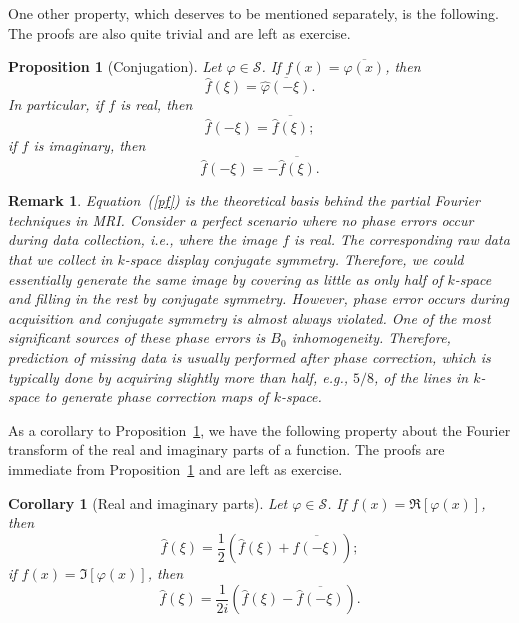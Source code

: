 \documentclass[12pt, letterpaper]{article}
\theoremstyle{plain}
\newtheorem{corollary}[theorem]{Corollary}
\newtheorem{proposition}[theorem]{Proposition}
\newtheorem{remark}[theorem]{Remark}
\renewcommand{\phi}{\varphi}
\begin{document}
One other property, which deserves to be mentioned separately, is the following. The proofs are also quite trivial and are left as exercise. 

\begin{proposition}[Conjugation]\label{conjugation}
    Let $\phi \in \mathcal{S}$. If $f(x) = \overline{\phi(x)}$, then
    \begin{equation}
        \hat{f}(\xi) = \overline{\hat{\phi}(-\xi)}.
    \end{equation}
    In particular, if $f$ is real, then
    \begin{equation}\label{pf}
        \hat{f}(-\xi) = \overline{\hat{f}(\xi)};
    \end{equation}
    if $f$ is imaginary, then
    \begin{equation}
        \hat{f}(-\xi) = -\overline{\hat{f}(\xi)}.
    \end{equation}
\end{proposition}

\begin{remark}
    Equation~(\ref{pf}) is the theoretical basis behind the partial Fourier techniques in MRI. Consider a perfect scenario where no phase errors occur during data collection, i.e., where the image $f$ is real. The corresponding raw data that we collect in $k$-space display conjugate symmetry. Therefore, we could essentially generate the same image by covering as little as only half of $k$-space and filling in the rest by conjugate symmetry. However, phase error occurs during acquisition and conjugate symmetry is almost always violated. One of the most significant sources of these phase errors is $B_0$ inhomogeneity. Therefore, prediction of missing data is usually performed \emph{after} phase correction, which is typically done by acquiring slightly more than half, e.g., $5/8$, of the lines in $k$-space to generate phase correction maps of $k$-space.
\end{remark}

As a corollary to Proposition~\ref{conjugation}, we have the following property about the Fourier transform of the real and imaginary parts of a function. The proofs are immediate from Proposition~\ref{conjugation} and are left as exercise.

\begin{corollary}[Real and imaginary parts]\label{re_im}
    Let $\phi \in \mathcal{S}$. If $f(x) = \Re [\phi(x)]$, then
    \begin{equation}
        \hat{f}(\xi) = \frac{1}{2}\left(\hat{f}(\xi) + \overline{\hat{f}(-\xi)}\right);
    \end{equation}
    if $f(x) = \Im[\phi(x)]$, then
    \begin{equation}
        \hat{f}(\xi) = \frac{1}{2i}\left(\hat{f}(\xi) - \overline{\hat{f}(-\xi)}\right).
    \end{equation}
\end{corollary}
\end{document}
